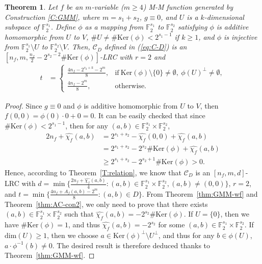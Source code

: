 \documentclass[10pt]{article}
\newtheorem{theorem}{Theorem}
\newcommand{\F}{\mathbb{F}}
\newcommand{\0}{\textbf{0}}
\newcommand{\1}{\textbf{1}}
\newcommand{\C}{{\mathcal C}}
\newcommand{\W}[2][]{\widehat{\chi_{#2}}^{#1}}
\begin{document}
\begin{theorem}\label{thm:LRC-MM}
Let $f$ be an $m$-variable ($m\geq 4$) M-M function generated by Construction \ref{C:GMM}, where $m=s_1+s_2$, $g\equiv 0$, and $U$ is a  $k$-dimensional
subspace of $\F_2^{s_1}$.
Define $\phi$ as a mapping from $\F_2^{s_1}$ to $\F_2^{s_2}$ satisfying
$\phi$ is additive homomorphic from $U$ to $V$, $\#U\ne \#\mathrm{Ker}(\phi)<2^{s_1-1}$ if $k\geqslant 1$, and $\phi$ is injective from $\F_2^{s_1}\setminus U$ to $\F_2^{s_2}\setminus V$.
Then, $\C_D$ defined in (\ref{eq:C-D}) is an $[n_f, m, \frac{n_f}{2}-2^{s_2-2}\#\mathrm{Ker}(\phi)]$-LRC with $r=2$
and
\begin{align*}
    t&=\left\{\begin{array}{ll}
               \frac{4n_f-2^{s_2+k}-2^{m}}{8} , & \mbox{if}~\mathrm{Ker}(\phi)\setminus\{0\}\neq \emptyset, ~\phi(U)^{\bot}\neq \emptyset,\\
                \frac{4n_f-2^{m}}{8}, & \mbox{otherwise}.
               \end{array}\right.
\end{align*}
\end{theorem}

\begin{proof}
    Since $g\equiv 0$ and $\phi$ is additive homomorphic from $U$ to $V$, then $f(0,0)=\phi(0)\cdot 0+0=0$.
    It can be easily checked that since $\#\mathrm{Ker}(\phi)<2^{s_1-1}$, then for any $(a,b)\in\F_2^{s_1}\times\F_2^{s_2}$,
    \begin{align*}
        2n_f+\W f(a,b)&=2^{s_1+s_2}-\W f(0,0)+\W f(a,b)\\
                             &=2^{s_1+s_2}-2^{s_2}\#\mathrm{Ker}(\phi)+\W f(a,b)\\
                             &\geqslant 2^{s_1+s_2}-2^{s_2+1}\#\mathrm{Ker}(\phi)>0.
    \end{align*}
    Hence, according to Theorem~\ref{T:relation}, we know that
   $\C_D$ is an $[n_f, m, d]$-LRC with $d=\min\{\frac{2n_f+\W f(a,b)}{4} : (a,b)\in\F_2^{s_1}\times\F_2^{s_2}, (a,b)\ne (0,0)\}$, $r=2$,
and $t=\min\{\frac{4n_f+A_f(a,b)-2^{m}}{8} : (a,b)\in D\}$.
From Theorem~\ref{thm:GMM-wf} and Theorem~\ref{thm:AC-con2},
we only need to prove that there exists $(a,b)\in\F_2^{s_1}\times\F_2^{s_2}$ such that $\W f(a,b)=-2^{s_2}\#\mathrm{Ker}(\phi)$.
If $U=\{0\}$, then we have $\#\mathrm{Ker}(\phi)=1$, and thus $\W f(a,b)=-2^{s_2}$ for some $(a,b)\in\F_2^{s_1}\times\F_2^{s_2}$.
If $\mathrm{dim}(U)\geqslant 1$,
then we choose $a\in \mathrm{Ker}(\phi)^{\bot}\setminus U^{\bot}$,
and thus for any $b\in \phi(U)$, $a\cdot \phi^{-1}(b)\ne 0$.
The desired result is therefore deduced thanks to Theorem~\ref{thm:GMM-wf}.
\end{proof}
\end{document}
